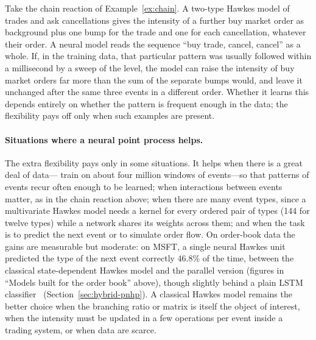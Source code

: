 \begin{example}
Take the chain reaction of Example~\ref{ex:chain}. A two-type Hawkes model of trades and ask
cancellations gives the intensity of a further buy market order as background plus one bump for the
trade and one for each cancellation, whatever their order. A neural model reads the sequence ``buy
trade, cancel, cancel'' as a whole. If, in the training data, that particular pattern was usually
followed within a millisecond by a sweep of the level, the model can raise the intensity of buy market
orders far more than the sum of the separate bumps would, and leave it unchanged after the same three
events in a different order. Whether it learns this depends entirely on whether the pattern is
frequent enough in the data; the flexibility pays off only when such examples are present.
\end{example}
\paragraph{Situations where a neural point process helps.} The extra flexibility pays only in some situations. It helps when there is a
great deal of data---\citet{shi2022sdpnhp} train on about four million windows of events---so that patterns of
events recur often enough to be learned; when interactions between events matter, as in the chain reaction
above; when there are many event types, since a multivariate Hawkes model needs a kernel for every ordered pair
of types (144 for twelve types) while a network shares its weights across them; and when the task is to predict
the next event or to simulate order flow. On order-book data the gains are measurable but moderate: on MSFT, a
single neural Hawkes unit predicted the type of the next event correctly 46.8\% of the time, between the
classical state-dependent Hawkes model and the parallel version (figures in ``Models built for the order book''
above), though slightly behind a plain LSTM classifier~\citep{shi2022sdpnhp} (Section~\ref{sec:hybrid-pnhp}). A classical Hawkes
model remains the better choice when the branching ratio or matrix is itself the object of interest, when the
intensity must be updated in a few operations per event inside a trading system, or when data are scarce.



